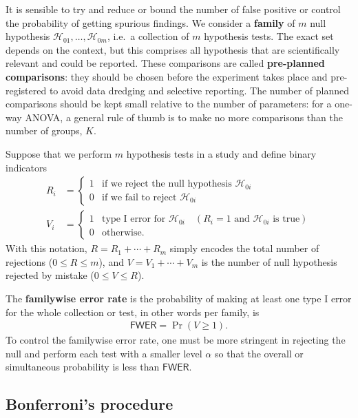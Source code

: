 \documentclass[
  11pt,
  letterpaper,
]{scrbook}
\theoremstyle{definition}
\theoremstyle{remark}
\begin{document}
It is sensible to try and reduce or bound the number of false positive
or control the probability of getting spurious findings. We consider a
\textbf{family} of \(m\) null hypothesis
\(\mathscr{H}_{01}, \ldots, \mathscr{H}_{0m}\), i.e.~a collection of
\(m\) hypothesis tests. The exact set depends on the context, but this
comprises all hypothesis that are scientifically relevant and could be
reported. These comparisons are called \textbf{pre-planned comparisons}:
they should be chosen before the experiment takes place and
pre-registered to avoid data dredging and selective reporting. The
number of planned comparisons should be kept small relative to the
number of parameters: for a one-way ANOVA, a general rule of thumb is to
make no more comparisons than the number of groups, \(K\).

Suppose that we perform \(m\) hypothesis tests in a study and define
binary indicators \begin{align}
R_i &= \begin{cases} 1 & \text{if we reject the null hypothesis }  \mathscr{H}_{0i} \\
0 & \text{if we fail to reject } \mathscr{H}_{0i}
\end{cases}\\
V_i &=\begin{cases} 1 & \text{type I error for } \mathscr{H}_{0i}\quad  (R_i=1 \text{ and  }\mathscr{H}_{0i} \text{ is true}) \\ 0 & \text{otherwise}.
\end{cases}
\end{align} With this notation, \(R=R_1 + \cdots + R_m\) simply encodes
the total number of rejections (\(0 \leq R \leq m\)), and
\(V = V_1 + \cdots + V_m\) is the number of null hypothesis rejected by
mistake (\(0 \leq V \leq R\)).

The \textbf{familywise error rate} is the probability of making at least
one type I error for the whole collection or test, in other words per
family, is \begin{align*}
\mathsf{FWER} = \Pr(V \geq 1).
\end{align*} To control the familywise error rate, one must be more
stringent in rejecting the null and perform each test with a smaller
level \(\alpha\) so that the overall or simultaneous probability is less
than \(\mathsf{FWER}\).

\hypertarget{bonferronis-procedure}{%
\subsection{Bonferroni's procedure}\label{bonferronis-procedure}}
\end{document}
